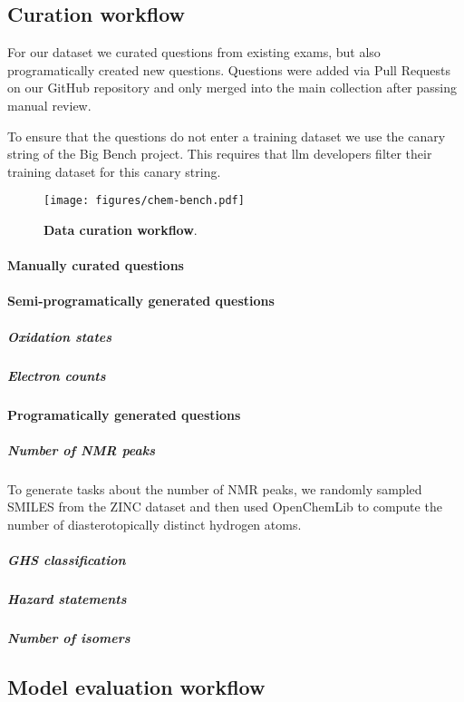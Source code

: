 \documentclass[11pt, oneside]{article}
\begin{document}
\subsection{Curation workflow} \label{sec:curation}
For our dataset we curated questions from existing exams, but also programatically created new questions. Questions were added via Pull Requests on our GitHub repository and only merged into the main collection after passing manual review.

To ensure that the questions do not enter a training dataset we use the canary string of the Big Bench project. This requires that \Gls{llm} developers filter their training dataset for this canary string.  

\begin{figure}
    \texttt{[image: figures/chem-bench.pdf]}
        \caption{\textbf{Data curation workflow}.}
\end{figure}

\paragraph{Manually curated questions}

\paragraph{Semi-programatically generated questions}

\subparagraph{Oxidation states}

\subparagraph{Electron counts}

\paragraph{Programatically generated questions} 
\subparagraph{Number of NMR peaks} To generate tasks about the number of NMR peaks, we randomly sampled SMILES from the ZINC dataset and then used OpenChemLib\cite{openchemlib} to compute the number of diasterotopically distinct hydrogen atoms. 

\subparagraph{GHS classification}

\subparagraph{Hazard statements}

\subparagraph{Number of isomers}


\subsection{Model evaluation workflow}
\end{document}
